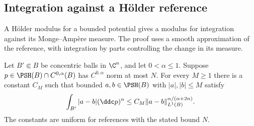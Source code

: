 \subsection{Integration against a H\"older reference}

A H\"older modulus for a bounded potential gives a modulus for integration against its Monge--Amp\`ere measure. The proof uses a smooth approximation of the reference, with integration by parts controlling the change in its measure.

\begin{lemma}\label{lem:local-holder-reference-integrals}
Let $B'\Subset B$ be concentric balls in $\C^n$, and let $0<\alpha\leq1$. Suppose $p\in\PSH(B)\cap C^{0,\alpha}(B)$ has $C^{0,\alpha}$ norm at most $N$. For every $M\geq1$ there is a constant $C_M$ such that bounded $a,b\in\PSH(B)$ with $|a|,|b|\leq M$ satisfy
\[
 \int_{B'}|a-b|(\ddc p)^n
 \leq C_M\|a-b\|_{L^1(B)}^{\alpha/(\alpha+2n)}.
\]
The constants are uniform for references with the stated bound $N$.
\end{lemma}
